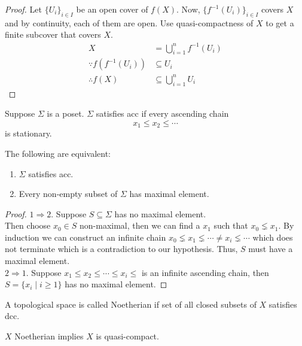 \documentclass[oneside, 12pt, ]{scrbook}
\theoremstyle{theorem}
\begin{document}
\begin{proof}
Let $\{U_{i}\}_{i \in I}$ be an open cover of $f(X)$. Now, $\{f^{-1}(U_{i})\}_{i \in I}$ covers $X$ and by continuity, each of them are open. Use quasi-compactness of $X$ to get a finite subcover that covers $X$.
\begin{align*}
X &= \bigcup_{i=1}^n f^{-1}(U_{i}) \\
\because f(f^{-1}(U_{i})) &\subseteq U_{i} \\
\therefore f(X) &\subseteq \bigcup_{i=1}^n U_{i} 
\end{align*}
\end{proof}

Suppose $\Sigma$ is a poset. $\Sigma$ satisfies acc if every ascending chain $$x_{1} \le x_{2} \le \cdots $$ is stationary.

\begin{lemma}
The following are equivalent: 
\begin{enumerate}
\item $\Sigma$ satisfies acc. 
\item Every non-empty subset of $\Sigma$ has maximal element.
\end{enumerate}
\end{lemma}

\begin{proof}
$1 \Rightarrow 2$. Suppose $S \subseteq \Sigma$ has no maximal element. \\
Then choose $x_{0} \in S$ non-maximal, then we can find a $x_{1}$ such that $x_{0} \lneq x_{1}$. By induction we can construct an infinite chain $x_{0} \lneq x_{1} \lneq \cdots \neq x_{i} \lneq \cdots$ which does not terminate which is a contradiction to our hypothesis. Thus, $S$ must have a maximal element.\\
$2 \Rightarrow 1$. Suppose $x_{1} \le x_{2} \le \cdots \le x_{i} \le $ is an infinite ascending chain, then $S = \{x_{i}\mid i \geq 1\}$ has no maximal element. 
\end{proof}

\begin{definition}
A topological space is called Noetherian if set of all closed subsets of $X$ satisfies dcc.
\end{definition}

\begin{lemma}
$X$ Noetherian implies $X$ is quasi-compact.
\end{lemma}
\end{document}
